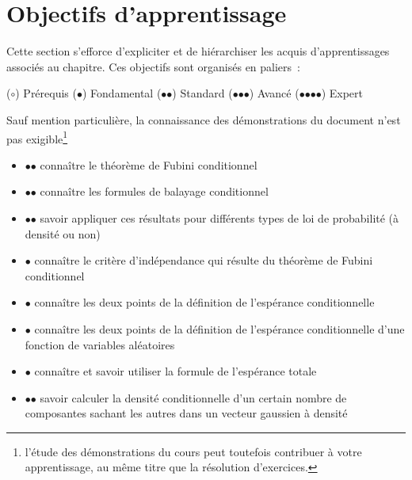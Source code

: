 \chapter{Objectifs d'apprentissage}\label{III-objectifs-dapprentissage}

Cette section s'efforce d'expliciter et de hiérarchiser les acquis
d'apprentissages associés au chapitre. Ces objectifs sont organisés en
paliers~:

($\mathord{\boldsymbol{\circ}}$) Prérequis ($\mathord{\bullet}$)
Fondamental ($\mathord{\bullet}\mathord{\bullet}$) Standard
($\mathord{\bullet}\mathord{\bullet}\mathord{\bullet}$) Avancé
($\mathord{\bullet}\mathord{\bullet}\mathord{\bullet}\mathord{\bullet}$)
Expert

Sauf mention particulière, la connaissance des démonstrations du
document n'est pas exigible\footnote{l'étude des démonstrations du cours
  peut toutefois contribuer à votre apprentissage, au même titre que la
  résolution d'exercices.}

\label{III-lois-conditionnelles}

\begin{itemize}
\tightlist
\item
  $\mathord{\bullet}\mathord{\bullet}$ connaître le théorème de Fubini
  conditionnel
\item
  $\mathord{\bullet}\mathord{\bullet}$ connaître les formules de
  balayage conditionnel
\item
  $\mathord{\bullet}\mathord{\bullet}$ savoir appliquer ces résultats
  pour différents types de loi de probabilité (à densité ou non)
\item
  $\mathord{\bullet}$ connaître le critère d'indépendance qui résulte du
  théorème de Fubini conditionnel
\end{itemize}

\label{III-espuxe9rance-conditionnelle}

\begin{itemize}
\tightlist
\item
  $\mathord{\bullet}$ connaître les deux points de la définition de
  l'espérance conditionnelle
\item
  $\mathord{\bullet}$ connaître les deux points de la définition de
  l'espérance conditionnelle d'une fonction de variables aléatoires
\item
  $\mathord{\bullet}$ connaître et savoir utiliser la formule de
  l'espérance totale
\item
  $\mathord{\bullet}\mathord{\bullet}$ savoir calculer la densité
  conditionnelle d'un certain nombre de composantes sachant les autres
  dans un vecteur gaussien à densité
\end{itemize}

